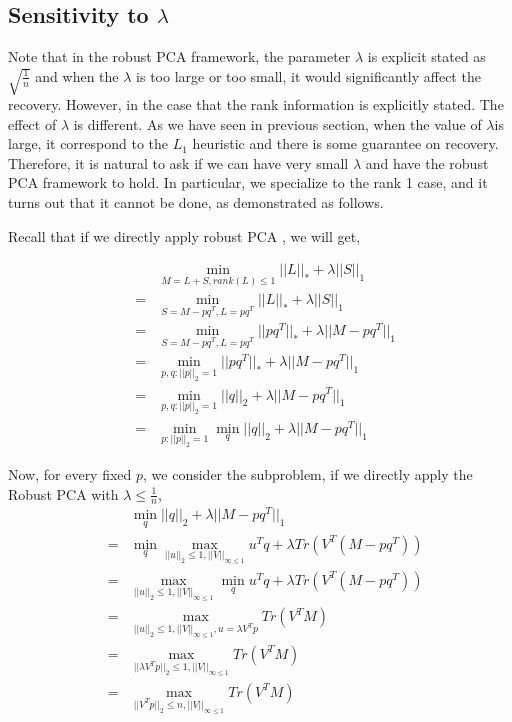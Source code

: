 \subsection{Sensitivity to $\lambda$}

Note that in the robust PCA framework, the parameter $\lambda$ is
explicit stated as $\sqrt{\frac{1}{n}}$ and when the $\lambda$ is
too large or too small, it would significantly affect the recovery.
However, in the case that the rank information is explicitly stated.
The effect of $\lambda$ is different. As we have seen in previous
section, when the value of $\lambda$is large, it correspond to the
$L_{1}$ heuristic and there is some guarantee on recovery. Therefore,
it is natural to ask if we can have very small $\lambda$ and have
the robust PCA framework to hold. In particular, we specialize to
the rank 1 case, and it turns out that it cannot be done, as demonstrated
as follows.

Recall that if we directly apply robust PCA , we will get,

\begin{eqnarray*}
 &  & \min_{M=L+S,rank(L)\le1}||L||_{*}+\lambda||S||_{1}\\
 & = & \min_{S=M-pq^{T},L=pq^{T}}||L||_{*}+\lambda||S||_{1}\\
 & = & \min_{S=M-pq^{T},L=pq^{T}}||pq^{T}||_{*}+\lambda||M-pq^{T}||_{1}\\
 & = & \min_{p,q:||p||_{2}=1}||pq^{T}||_{*}+\lambda||M-pq^{T}||_{1}\\
 & = & \min_{p,q:||p||_{2}=1}||q||_{2}+\lambda||M-pq^{T}||_{1}\\
 & = & \min_{p:||p||_{2}=1}\min_{q}||q||_{2}+\lambda||M-pq^{T}||_{1}
\end{eqnarray*}


Now, for every fixed $p$, we consider the subproblem, if we directly
apply the Robust PCA with $\lambda\le\frac{1}{n}$,
\begin{eqnarray*}
 &  & \min_{q}||q||_{2}+\lambda||M-pq^{T}||_{1}\\
 & = & \min_{q}\max_{||u||_{2}\le1,||V||_{\infty\le1}}u^{T}q+\lambda Tr(V^{T}(M-pq^{T}))\\
 & = & \max_{||u||_{2}\le1,||V||_{\infty\le1}}\min_{q}u^{T}q+\lambda Tr(V^{T}(M-pq^{T}))\\
 & = & \max_{||u||_{2}\le1,||V||_{\infty\le1},u=\lambda V^{T}p}Tr(V^{T}M)\\
 & = & \max_{||\lambda V^{T}p||_{2}\le1,||V||_{\infty\le1}}Tr(V^{T}M)\\
 & = & \max_{||V^{T}p||_{2}\le n,||V||_{\infty\le1}}Tr(V^{T}M)
\end{eqnarray*}


